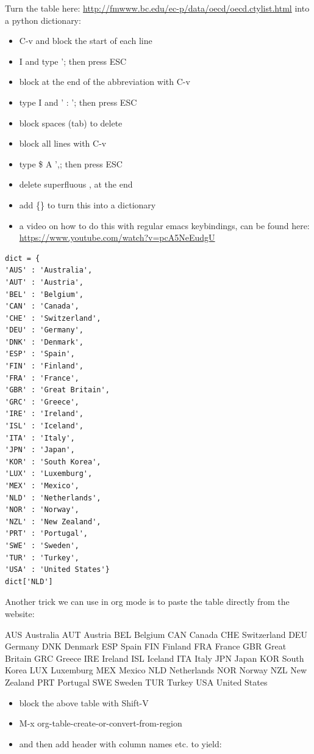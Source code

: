 \documentclass[11pt]{article}
\begin{document}
Turn the table here: \url{http://fmwww.bc.edu/ec-p/data/oecd/oecd.ctylist.html} into a python dictionary:
\begin{itemize}
\item C-v and block the start of each line
\item I and type '; then press ESC
\item block at the end of the abbreviation with C-v
\item type I and ' : '; then press ESC
\item block spaces (tab) to delete
\item block all lines with C-v
\item type \$ A ',; then press ESC
\item delete superfluous , at the end
\item add \{\} to turn this into a dictionary
\item a video on how to do this with regular emacs keybindings, can be found here: \url{https://www.youtube.com/watch?v=pcA5NeEudgU}
\end{itemize}

\begin{verbatim}
dict = {
'AUS' : 'Australia',
'AUT' : 'Austria',
'BEL' : 'Belgium',
'CAN' : 'Canada',
'CHE' : 'Switzerland',
'DEU' : 'Germany',
'DNK' : 'Denmark',
'ESP' : 'Spain',
'FIN' : 'Finland',
'FRA' : 'France',
'GBR' : 'Great Britain',
'GRC' : 'Greece',
'IRE' : 'Ireland',
'ISL' : 'Iceland',
'ITA' : 'Italy',
'JPN' : 'Japan',
'KOR' : 'South Korea',
'LUX' : 'Luxemburg',
'MEX' : 'Mexico',
'NLD' : 'Netherlands',
'NOR' : 'Norway',
'NZL' : 'New Zealand',
'PRT' : 'Portugal',
'SWE' : 'Sweden',
'TUR' : 'Turkey',
'USA' : 'United States'}
dict['NLD']
\end{verbatim}

Another trick we can use in org mode is to paste the table directly from the website:

AUS 	Australia
AUT 	Austria
BEL 	Belgium
CAN 	Canada
CHE 	Switzerland
DEU 	Germany
DNK 	Denmark
ESP 	Spain
FIN 	Finland
FRA 	France
GBR 	Great Britain
GRC 	Greece
IRE 	Ireland
ISL 	Iceland
ITA 	Italy
JPN 	Japan
KOR 	South Korea
LUX 	Luxemburg
MEX 	Mexico
NLD 	Netherlands
NOR 	Norway
NZL 	New Zealand
PRT 	Portugal
SWE 	Sweden
TUR 	Turkey
USA 	United States

\begin{itemize}
\item block the above table with Shift-V
\item M-x org-table-create-or-convert-from-region
\item and then add header with column names etc. to yield:
\end{itemize}
\end{document}

